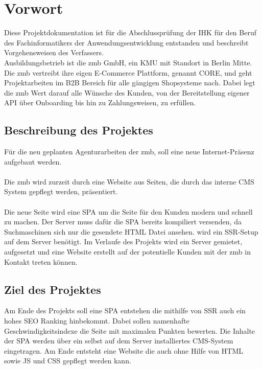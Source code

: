 \documentclass[11pt,a4paper]{article}
\begin{document}
\section{Vorwort}
Diese Projektdokumentation ist für die Abschlussprüfung der IHK für den Beruf des Fachinformatikers der Anwendungsentwicklung entstanden und beschreibt Vorgehensweisen des Verfassers.\\
Ausbildungsbetrieb ist die zmb GmbH, ein \acs{KMU} mit Standort in Berlin Mitte.
Die zmb vertreibt ihre eigen E-Commerce Plattform, genannt CORE, und geht Projektarbeiten im \acs{B2B} Bereich für alle gängigen Shopsysteme nach.
Dabei legt die zmb Wert darauf alle Wünsche des Kunden, von der Bereitstellung eigener API über Onboarding bis hin zu Zahlungsweisen, zu erfüllen.
\subsection{Beschreibung des Projektes}
Für die neu geplanten Agenturarbeiten der zmb, soll eine neue Internet-Präsenz aufgebaut werden.\\\\
Die zmb wird zurzeit durch eine Website aus Seiten, die durch das interne CMS System gepflegt werden, präsentiert.\\\\
Die neue Seite wird eine \acs{SPA} um die Seite für den Kunden modern und schnell zu machen.
Der Server muss dafür die \acs{SPA} bereits kompiliert versenden, da Suchmaschinen sich nur die gesendete HTML Datei ansehen. wird ein \acs{SSR}-Setup auf dem Server benötigt.
Im Verlaufe des Projekts wird ein Server gemietet, aufgesetzt und eine Website erstellt auf der potentielle Kunden mit der zmb in Kontakt treten können.
\subsection{Ziel des Projektes}
Am Ende des Projekts soll eine \acs{SPA} entstehen die mithilfe von \acs{SSR} auch ein hohes SEO Ranking hinbekommt. Dabei sollen namenhafte Geschwindigkeitsindexe die Seite mit maximalen Punkten bewerten.
Die Inhalte der \acs{SPA} werden über ein selbst auf dem Server installiertes CMS-System eingetragen.
Am Ende entsteht eine Website die auch ohne Hilfe von HTML sowie JS und CSS gepflegt werden kann.
\end{document}

